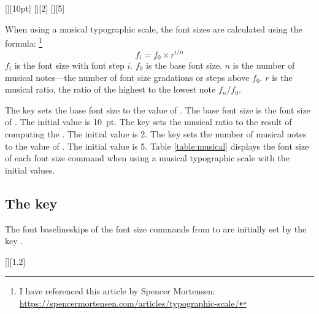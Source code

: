 \documentclass{beery}
\begin{document}


\begin{displaycode}
  [][10pt]%
  \nopagebreak\newline
  [][2]%
  \nopagebreak\newline
  [][5]
\end{displaycode}

When using a musical typographic scale, the font sizes are calculated using the formula:%
\footnote
  {
    I have referenced this article by Spencer Mortensen:
    \newline
    \url{https://spencermortensen.com/articles/typographic-scale/}
  }
\begin{equation}\label{eq:musical}
  f_i = f_0 \times r ^ { i / n }
\end{equation}
$f_i$ is the font size with font step $i$.
$f_0$ is the base font size.
$n$ is the number of musical notes---the number of font size gradations or steps above $f_0$.
$r$ is the musical ratio, the ratio of the highest to the lowest note $ f_n / f_0 $.

The key  sets the base font size to the value of .
The base font size is the font size of .
The initial value is \qty{10}{pt}.
The key  sets the musical ratio to the result of computing the .
The initial value is \num{2}.
The key  sets the number of musical notes to the value of .
The initial value is \num{5}.
Table \ref{table:musical} displays the font size of each font size command when using a musical typographic scale with the initial values.



\subsection{The key }
\label{subsec:baselineskipsizeratio}

The font baselineskips of the font size commands from  to  are initially set by the key .

\begin{displaycode}
  [][1.2]
\end{displaycode}
\end{document}
